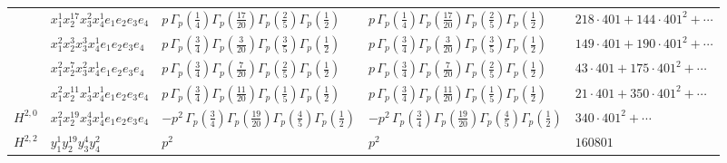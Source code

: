\documentclass[11pt]{article}
\begin{document}
\begin{table}[ht]
{\begin{tabular}{@{}lllll@{}}
 & $x_{1}^{1} x_{2}^{17} x_{3}^{2} x_{4}^{1}  e_{1} e_{2} e_{3} e_{4}$ & $p \, \Gamma_p \left( \frac{1}{4} \right) \Gamma_p \left( \frac{17}{20} \right) \Gamma_p \left( \frac{2}{5} \right) \Gamma_p \left( \frac{1}{2} \right)$ & $p \, \Gamma_p \left( \frac{1}{4} \right) \Gamma_p \left( \frac{17}{20} \right) \Gamma_p \left( \frac{2}{5} \right) \Gamma_p \left( \frac{1}{2} \right)$ & $218{\cdot}401{+}144{\cdot}401^{2}{+}\cdots$ \\
 & $x_{1}^{2} x_{2}^{3} x_{3}^{3} x_{4}^{1}  e_{1} e_{2} e_{3} e_{4}$ & $p \, \Gamma_p \left( \frac{3}{4} \right) \Gamma_p \left( \frac{3}{20} \right) \Gamma_p \left( \frac{3}{5} \right) \Gamma_p \left( \frac{1}{2} \right)$ & $p \, \Gamma_p \left( \frac{3}{4} \right) \Gamma_p \left( \frac{3}{20} \right) \Gamma_p \left( \frac{3}{5} \right) \Gamma_p \left( \frac{1}{2} \right)$ & $149{\cdot}401{+}190{\cdot}401^{2}{+}\cdots$ \\
 & $x_{1}^{2} x_{2}^{7} x_{3}^{2} x_{4}^{1}  e_{1} e_{2} e_{3} e_{4}$ & $p \, \Gamma_p \left( \frac{3}{4} \right) \Gamma_p \left( \frac{7}{20} \right) \Gamma_p \left( \frac{2}{5} \right) \Gamma_p \left( \frac{1}{2} \right)$ & $p \, \Gamma_p \left( \frac{3}{4} \right) \Gamma_p \left( \frac{7}{20} \right) \Gamma_p \left( \frac{2}{5} \right) \Gamma_p \left( \frac{1}{2} \right)$ & $43{\cdot}401{+}175{\cdot}401^{2}{+}\cdots$ \\
 & $x_{1}^{2} x_{2}^{11} x_{3}^{1} x_{4}^{1}  e_{1} e_{2} e_{3} e_{4}$ & $p \, \Gamma_p \left( \frac{3}{4} \right) \Gamma_p \left( \frac{11}{20} \right) \Gamma_p \left( \frac{1}{5} \right) \Gamma_p \left( \frac{1}{2} \right)$ & $p \, \Gamma_p \left( \frac{3}{4} \right) \Gamma_p \left( \frac{11}{20} \right) \Gamma_p \left( \frac{1}{5} \right) \Gamma_p \left( \frac{1}{2} \right)$ & $21{\cdot}401{+}350{\cdot}401^{2}{+}\cdots$ \\
\midrule
$H^{2,0}$ & $x_{1}^{2} x_{2}^{19} x_{3}^{4} x_{4}^{1}  e_{1} e_{2} e_{3} e_{4}$ & $- p^{2} \, \Gamma_p \left( \frac{3}{4} \right) \Gamma_p \left( \frac{19}{20} \right) \Gamma_p \left( \frac{4}{5} \right) \Gamma_p \left( \frac{1}{2} \right)$ & $- p^{2} \, \Gamma_p \left( \frac{3}{4} \right) \Gamma_p \left( \frac{19}{20} \right) \Gamma_p \left( \frac{4}{5} \right) \Gamma_p \left( \frac{1}{2} \right)$ & $340{\cdot}401^{2}{+}\cdots$ \\
\midrule
$H^{2,2}$ & $y_{1}^{1} y_{2}^{19} y_{3}^{4} y_{4}^{2}$ & $p^{2} \,$ & $p^{2} \,$ & $160801$ \\
\bottomrule
\end{tabular}
}
\renewcommand{\arraystretch}{1.0}
\end{table}
\end{document}
